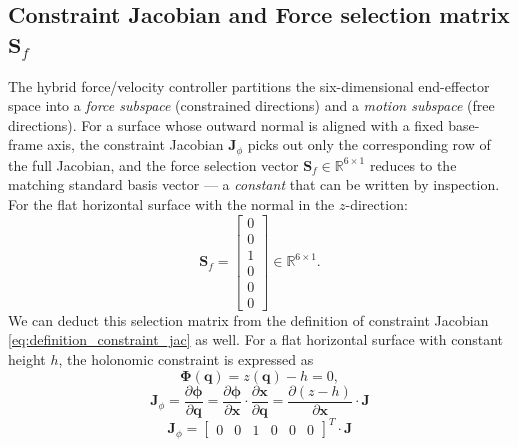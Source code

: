 \documentclass[
	german,%
	accentcolor=9c,%
	ruledheaders=section,%
	class=report,%
	thesis={type=bachelor},%
	fontsize=11pt,%
	parskip=half-,%
	custommargins=true,%
	marginpar=false,%
]{tudapub}
\begin{document}
\subsection*{Constraint Jacobian and Force selection matrix \(\mathbf{S}_f\)}

The hybrid force/velocity controller partitions the six-dimensional
end-effector space into a \emph{force subspace} (constrained directions)
and a \emph{motion subspace} (free directions).
For a surface whose outward normal is aligned with a fixed base-frame axis,
the constraint Jacobian $\mathbf{J}_{\phi}$ picks out only the corresponding
row of the full Jacobian, and the force selection vector
$\mathbf{S}_f \in \mathbb{R}^{6 \times 1}$ reduces to the matching standard
basis vector — a \emph{constant} that can be written by inspection.
For the flat horizontal surface with the normal in the $z$-direction:
%
\begin{equation}
    \mathbf{S}_{f}
    = \begin{bmatrix}0\\0\\1\\0\\0\\0\end{bmatrix}
    \in \mathbb{R}^{6\times 1}.
    \label{eq:Sf_flat}
\end{equation}
We can deduct this selection matrix from the definition of constraint Jacobian \eqref{eq:definition_constraint_jac} as well.
For a flat horizontal surface with constant height $h$, the holonomic constraint is expressed as
%
\begin{equation}
    \boldsymbol{\Phi}(\mathbf{q}) = z(\mathbf{q}) - h = 0,
    \label{eq:constraint_flat_surface}
\end{equation}
%
\begin{equation}
    \mathbf{J}_{\phi} = \frac{\partial \boldsymbol{\phi}}{\partial \mathbf{q}} = 
    \frac{\partial \boldsymbol{\phi}}{\partial \mathbf{x}} \cdot \frac{\partial \mathbf{x}}{\partial \mathbf{q}} = 
    \frac{\partial (z - h)}{\partial \mathbf{x}} \cdot \mathbf{J}
    \label{eq:constraint_jacobian}
\end{equation}
\begin{equation}
    \mathbf{J}_{\phi} = \begin{bmatrix}0 & 0 & 1 & 0 & 0 & 0\end{bmatrix} ^T \cdot \mathbf{J}
    \label{eq:constraint_jacobian_flat}
\end{equation}
\end{document}

